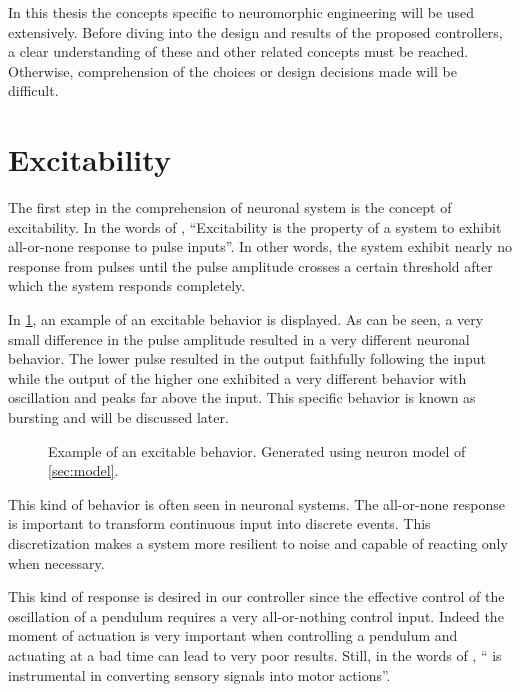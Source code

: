 \label{sec:neuro_expl}

In this thesis the concepts specific to neuromorphic engineering will be used extensively. 
Before diving into the design and results of the proposed controllers, a clear understanding of these and other related concepts must be reached. 
Otherwise, comprehension of the choices or design decisions made will be difficult.

\section{Excitability}

The first step in the comprehension of neuronal system is the concept of excitability. In the words of \citet{excDef}, \enquote{Excitability is the property of a system to exhibit all-or-none response to pulse inputs}. 
In other words, the system exhibit nearly no response from pulses until the pulse amplitude crosses a certain threshold after which the system responds completely. 

In \cref{fig:excitability}, an example of an excitable behavior is displayed. 
As can be seen, a very small difference in the pulse amplitude resulted in a very different neuronal behavior. 
The lower pulse resulted in the output faithfully following the input while the output of the higher one exhibited a very different behavior with oscillation and  peaks far above the input. 
This specific behavior is known as bursting and will be discussed later.

\begin{figure}[htb]
    \centering
    \caption{Example of an excitable behavior. Generated using neuron model of \cref{sec:model}.}
    \label{fig:excitability}
\end{figure}

This kind of behavior is often seen in neuronal systems.
The all-or-none response is important to transform continuous input into discrete events. 
This discretization makes a system more resilient to noise and capable of reacting only when necessary.

This kind of response is desired in our controller since the effective control of the oscillation of a pendulum requires a very all-or-nothing control input. 
Indeed the moment of actuation is very important when controlling a pendulum and actuating at a bad time can lead to very poor results. 
Still, in  the words of \citet{excDef}, \enquote{ is instrumental in converting sensory signals into motor actions}.

